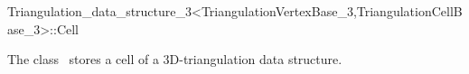 

\begin{ccRefClass}{Triangulation_data_structure_3<TriangulationVertexBase_3,TriangulationCellBase_3>::Cell}  %


\ccDefinition
  
The class \ccRefName\ stores a cell of a 3D-triangulation data structure.

\ccIsModel


\ccSeeAlso




\end{ccRefClass}


